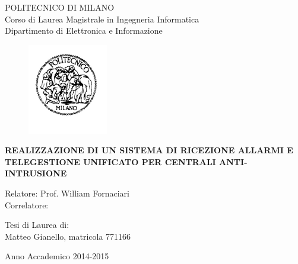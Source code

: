 \thispagestyle{empty}
\vspace*{-1.5cm} \bfseries{
\begin{center}
  \large
  POLITECNICO DI MILANO\\
  \normalsize
  Corso di Laurea Magistrale in Ingegneria Informatica\\
  Dipartimento di Elettronica e Informazione\\
  \begin{figure}[htbp]
    \begin{center}
      \includegraphics[width=3.5cm]{pictures/logopm}
    \end{center}
  \end{figure}
  \vspace*{0.3cm} \LARGE



  \textbf{REALIZZAZIONE DI UN SISTEMA DI RICEZIONE ALLARMI E TELEGESTIONE UNIFICATO PER CENTRALI ANTI-INTRUSIONE}\\



  \vspace*{.75truecm} \large
\end{center}
\vspace*{3.0cm} \large
\begin{flushleft}


  Relatore: Prof. William Fornaciari \\
  Correlatore:  

\end{flushleft}
\vspace*{1.0cm}
\begin{flushright}


  Tesi di Laurea di:\\ Matteo Gianello, matricola 771166


\end{flushright}
\vspace*{0.5cm}
\begin{center}



  Anno Accademico 2014-2015
\end{center} \clearpage
}
